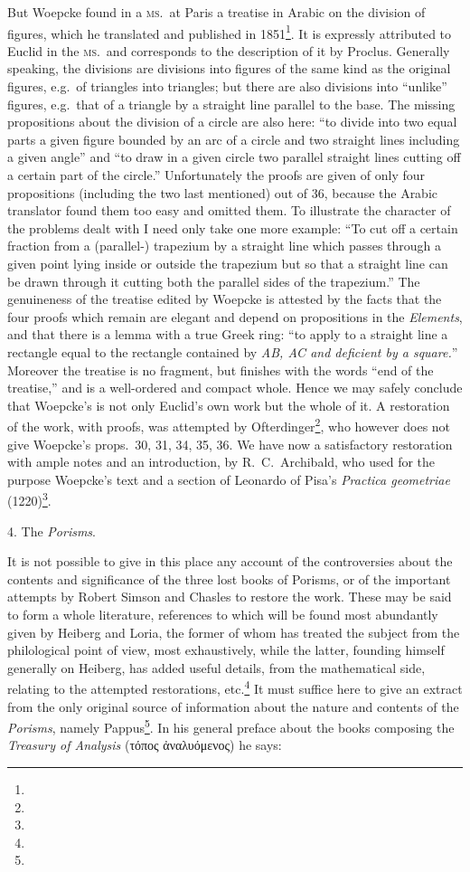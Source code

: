 But Woepcke found in a \textsc{ms.}\ at Paris a treatise in Arabic on the division of figures, which he translated and published in 1851\footnote{}. It is expressly attributed to Euclid in the \textsc{ms.}\ and corresponds to the description of it by Proclus. Generally speaking, the divisions are divisions into figures of the same kind as the original figures, e.g.~of triangles into triangles; but there are also divisions into ``unlike'' figures, e.g.~that of a triangle by a straight line parallel to the base. The missing propositions about the division of a circle are also here: ``to divide into two equal parts a given figure bounded by an arc of a circle and two straight lines including a given angle'' and ``to draw in a given circle two parallel straight lines cutting off a certain part of the circle.'' Unfortunately the proofs are given of only four propositions (including the two last mentioned) out of 36, because the Arabic translator found them too easy and omitted them. To illustrate the character of the problems dealt with I need only take one more example: ``To cut off a certain fraction from a (parallel-) trapezium by a straight line which passes through a given point lying inside or outside the trapezium but so that a straight line can be drawn through it cutting both the parallel sides of the trapezium.'' The genuineness of the treatise edited by Woepcke is attested by the facts that the four proofs which remain are elegant and depend on propositions in the \emph{Elements}, and that there is a lemma with a true Greek ring: ``to apply to a straight line a rectangle equal to the rectangle contained by \emph{AB, AC and deficient by a square.}'' Moreover the treatise is no fragment, but finishes with the words ``end of the treatise,'' and is a well-ordered and compact whole. Hence we may safely conclude that Woepcke's is not only Euclid's own work but the whole of it. A restoration of the work, with proofs, was attempted by Ofterdinger\footnote{}, who however does not give Woepcke's props.~30, 31, 34, 35, 36. We have now a satisfactory restoration with ample notes and an introduction, by R.~C.~Archibald, who used for the purpose Woepcke's text and a section of Leonardo of Pisa's \emph{Practica geometriae} (1220)\footnote{}.

4. The \emph{Porisms}.

It is not possible to give in this place any account of the controversies about the contents and significance of the three lost books of Porisms, or of the important attempts by Robert Simson and Chasles to restore the work. These may be said to form a whole literature, references to which will be found most abundantly given by Heiberg and Loria, the former of whom has treated the subject from the philological point of view, most exhaustively, while the latter, founding himself generally on Heiberg, has added useful details, from the mathematical side, relating to the attempted restorations, etc.\footnote{} It must suffice here to give an extract from the only original source of information about the nature and contents of the \emph{Porisms}, namely Pappus\footnote{}. In his general preface about the books composing the \emph{Treasury of Analysis} (τόπος ἀναλυόμενος) he says:


